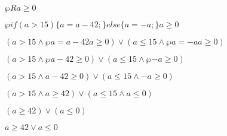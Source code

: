 \documentclass{lehramt-informatik-minimal}
\begin{document}

$\wp{R}{a \geq 0}$

$\wp{if (a > 15) \{a = a - 42;\} else \{ a = -a;\}}{a \geq 0}$

$
(a > 15 \land \wp{a = a - 42}{a \geq 0})
\lor
(a \leq 15 \land \wp{a = -a}{a \geq 0})
$

$
(a > 15 \land \wp{}{a - 42 \geq 0})
\lor
(a \leq 15 \land \wp{}{-a \geq 0})
$

$
(a > 15 \land a - 42 \geq 0)
\lor
(a \leq 15 \land -a \geq 0)
$

$
(a > 15 \land a \geq 42)
\lor
(a \leq 15 \land a \leq 0)
$

$
(a \geq 42)
\lor
(a \leq 0)
$

$
a \geq 42
\lor
a \leq 0
$
\end{document}
